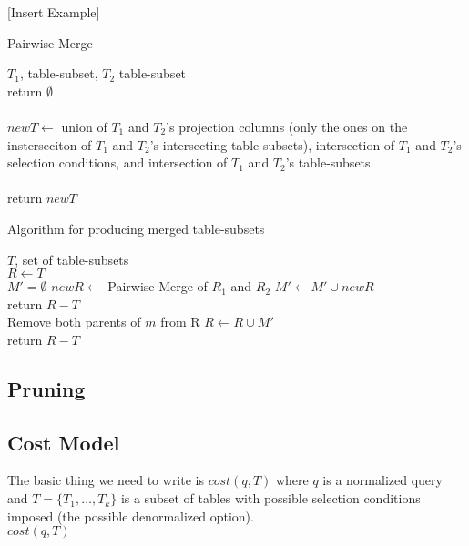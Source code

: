\documentclass[10pt]{article}
\begin{document}
[Insert Example]

\begin{algorithm}[H]
  \caption{Pairwise Merge}
  \begin{algorithmic}
    \INPUT $T_1$, table-subset, $T_2$ table-subset \\
      return $\emptyset$
    \EndIf
    \\
    \\
    $newT \gets$ union of $T_1$ and $T_2$'s projection columns (only the ones on the insterseciton of $T_1$ and $T_2$'s intersecting table-subsets), intersection of $T_1$ and $T_2$'s selection conditions, and intersection of $T_1$ and $T_2$'s table-subsets
    \\
    \\
    return $newT$
  \end{algorithmic}
\end{algorithm}

\begin{algorithm}[H]
  \caption{Algorithm for producing merged table-subsets}
  \begin{algorithmic}
    \INPUT $T$, set of table-subsets \\
    $R \gets T$ \\
      \State $M' = \emptyset$ 
        \State $newR \gets$ Pairwise Merge of $R_1$ and $R_2$
        \State $M' \gets M' \cup newR$
      \EndFor
      \\
        \State return $R - T$ 
      \EndIf
      \\
        \State Remove both parents of $m$ from R
      \EndFor   
      \State $R \gets R \cup M'$
      \\
    \EndWhile 
    \State return $R - T$
  \end{algorithmic}
\end{algorithm}

\subsection{Pruning}

\subsection{Cost Model}
The basic thing we need to write is $cost(q, T)$ where $q$ is a normalized query and $T = \{T_1, \ldots, T_k\}$ is a subset of tables with possible selection conditions imposed (the possible denormalized option). 
\\
$cost(q,T)$
\\
\\




\end{document}
